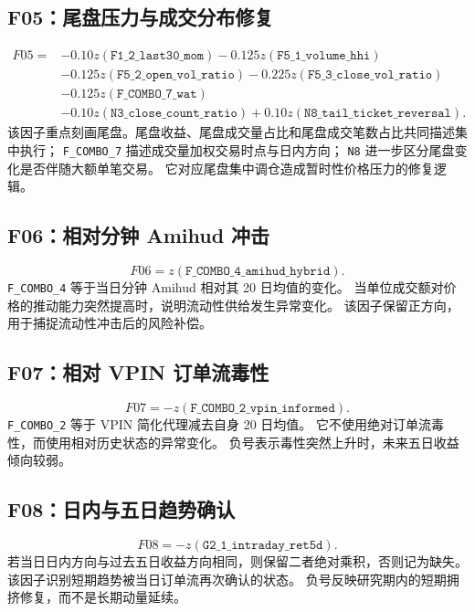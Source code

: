 \documentclass[UTF8,11pt,a4paper]{ctexart}
\newcommand{\z}[1]{z\!\left(#1\right)}
\begin{document}
\subsection{F05：尾盘压力与成交分布修复}
\begin{align}
F05={}&-0.10\z{\texttt{F1\_2\_last30\_mom}}
-0.125\z{\texttt{F5\_1\_volume\_hhi}} \nonumber\\
&-0.125\z{\texttt{F5\_2\_open\_vol\_ratio}}
-0.225\z{\texttt{F5\_3\_close\_vol\_ratio}} \nonumber\\
&-0.125\z{\texttt{F\_COMBO\_7\_wat}} \nonumber\\
&-0.10\z{\texttt{N3\_close\_count\_ratio}}
+0.10\z{\texttt{N8\_tail\_ticket\_reversal}}.
\end{align}
该因子重点刻画尾盘。尾盘收益、尾盘成交量占比和尾盘成交笔数占比共同描述集中执行；
\texttt{F\_COMBO\_7} 描述成交量加权交易时点与日内方向；
\texttt{N8} 进一步区分尾盘变化是否伴随大额单笔交易。
它对应尾盘集中调仓造成暂时性价格压力的修复逻辑。

\subsection{F06：相对分钟 Amihud 冲击}
\begin{equation}
F06=\z{\texttt{F\_COMBO\_4\_amihud\_hybrid}}.
\end{equation}
\texttt{F\_COMBO\_4} 等于当日分钟 Amihud 相对其 20 日均值的变化。
当单位成交额对价格的推动能力突然提高时，说明流动性供给发生异常变化。
该因子保留正方向，用于捕捉流动性冲击后的风险补偿。

\subsection{F07：相对 VPIN 订单流毒性}
\begin{equation}
F07=-\z{\texttt{F\_COMBO\_2\_vpin\_informed}}.
\end{equation}
\texttt{F\_COMBO\_2} 等于 VPIN 简化代理减去自身 20 日均值。
它不使用绝对订单流毒性，而使用相对历史状态的异常变化。
负号表示毒性突然上升时，未来五日收益倾向较弱。

\subsection{F08：日内与五日趋势确认}
\begin{equation}
F08=-\z{\texttt{G2\_1\_intraday\_ret5d}}.
\end{equation}
若当日日内方向与过去五日收益方向相同，则保留二者绝对乘积，否则记为缺失。
该因子识别短期趋势被当日订单流再次确认的状态。
负号反映研究期内的短期拥挤修复，而不是长期动量延续。
\end{document}
